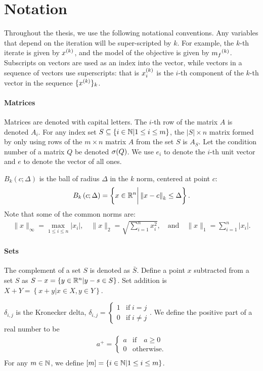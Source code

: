 \section{Notation}  Throughout the thesis, we use the following notational conventions.
Any variables that depend on the iteration will be super-scripted by $k$.
For example, the $k$-th iterate is given by $x^{(k)}$, and the model of the objective is given by ${{m}_f}^{(k)}$.
Subscripts on vectors are used as an index into the vector, while vectors in a sequence of vectors use superscripts:
that is $x_i^{(k)}$ is the $i$-th component of the $k$-th vector in the sequence $\{x^{(k)}\}_k$.

\paragraph*{Matrices}
Matrices are denoted with capital letters.
The $i$-th row of the matrix $A$ is denoted $A_i$.
For any index set $S \subseteq \{i \in \mathbb N | 1 \le i \le m\}$, the $|S| \times n$ matrix formed by only using
rows of the $m\times n$ matrix $A$ from the set $S$ is $A_S$.
Let the condition number of a matrix $Q$ be denoted ${\sigma}(Q)$.
We use $e_i$ to denote the $i$-th unit vector and $e$ to denote the vector of all ones.

$B_k\left(c; \Delta\right)$ is the ball of radius $\Delta$ in the $k$ norm, centered at point $c$:
\begin{align}
\label{define_ball}
B_k\left(c; \Delta\right) = \left\{x \in \mathbb R^n \bigg | \left\|x - c\right\|_k \le \Delta \right\}.
\end{align}
Note that some of the common norms are:
\begin{align*}
\|x\|_{\infty} = \max_{1\le i\le n}|x_i|, \quad
\|x\|_{2} = \sqrt{\sum_{i=1}^n x_i^2}, \quad \textrm{and} \quad
\|x\|_1 = \sum_{i = 1}^n |x_i|.
\end{align*}

\paragraph*{Sets}
The complement of a set $S$ is denoted as $\bar S$.
Define a point $x$ subtracted from a set $S$ as $S - x = \left\{y \in \mathbb R^n | y - s \in S\right\}$.
Set addition is $X + Y = \left\{x + y | x \in X, y \in Y\right\}$.

$\delta_{i,j}$ is the Kronecker delta, $\delta_{i, j} = \begin{cases} 1 & \textrm{if} \; i = j \\ 0 & \textrm{if} \; i \ne j \end{cases}$.
We define the positive part of a real number to be
\begin{align*}
a^+ = \begin{cases} a & \textrm{if} \quad a \ge 0 \\ 0 & \textrm{otherwise}. \end{cases}\\
\end{align*}
For any $m \in \mathbb N$, we define $[m] = \left\{i \in \mathbb N | 1 \le i \le m\right\}$.








